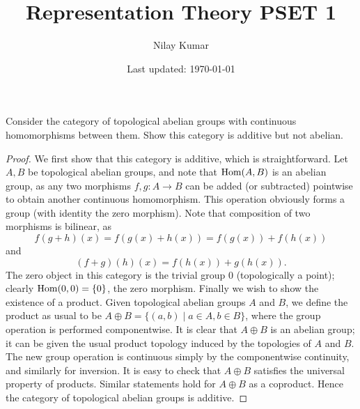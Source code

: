 \documentclass{../../mathnotes}
\title{Representation Theory PSET 1}
\author{Nilay Kumar}
\date{Last updated: \today}
\begin{document}
\maketitle

\begin{prop}
    Consider the category of topological abelian groups with continuous homomorphisms
    between them. Show this category is additive but not abelian.
\end{prop}
\begin{proof}
    We first show that this category is additive, which is straightforward. Let $A,B$ be topological
    abelian groups, and note that $\operatorname{Hom}(A,B)$ is an abelian group, as any two morphisms $f,g:A\to B$
    can be added (or subtracted) pointwise to obtain another continuous homomorphism. This operation
    obviously forms a group (with identity the zero morphism). Note that composition of two morphisms
    is bilinear, as
    \[f(g+h)(x)=f(g(x)+h(x))=f(g(x))+f(h(x))\]
    and
    \[(f+g)(h)(x)=f(h(x))+g(h(x)).\]
    The zero object in this category is the trivial group $0$ (topologically a point); clearly
    $\operatorname{Hom}(0,0)=\{0\}$, the zero morphism. Finally we wish to show the existence of a product.
    Given topological abelian groups $A$ and $B$, we define the product as usual to be
    $A\oplus B=\{(a,b)\mid a\in A,b\in B\}$, where the group operation is performed componentwise.
    It is clear that $A\oplus B$ is an abelian group; it can be given the usual product topology
    induced by the topologies of $A$ and $B$. The new group operation is continuous simply by the
    componentwise continuity, and similarly for inversion. It is easy to check that $A\oplus B$
    satisfies the universal property of products. Similar statements hold for $A\oplus B$ as a
    coproduct.
    Hence the category of topological abelian groups is additive.


\end{proof}
\end{document}
